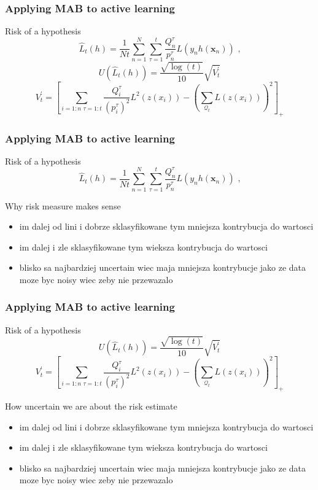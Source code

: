 \documentclass{beamer}
\begin{document}
  \begin{frame}
  \frametitle{Applying MAB to active learning}
  \begin{alertblock}{Risk of a hypothesis}
  $$
  \hat{L}_t(h) = \frac{1}{Nt} \sum_{n=1}^{N} \sum_{\tau = 1}^{t} 
\frac{Q^{\tau}_n}{p^{\tau}_n} L(y_n h(\mathbf{x}_n)) \text{~,}
  $$
  $$U(\hat{L}_t(h)) = \frac{ \sqrt{ \log(t) } }
                       { 10 }
                  \sqrt{ V^\prime_t }$$
  $$V^\prime_t = \left[
  \sum_{i = 1:n \text{~} \tau = 1:t} \frac{Q^\tau_i}{(p^\tau_i)^2} L^2(z(x_i))
  -
  \left( \sum_{\mathscr{Q}_t} L(z(x_i)) \right)^2
\right]_+$$
  \end{alertblock}
  \end{frame}
  \begin{frame}
  \frametitle{Applying MAB to active learning}
  \begin{alertblock}{Risk of a hypothesis}
  $$
  \hat{L}_t(h) = \frac{1}{Nt} \sum_{n=1}^{N} \sum_{\tau = 1}^{t} 
\frac{Q^{\tau}_n}{p^{\tau}_n} L(y_n h(\mathbf{x}_n)) \text{~,}
  $$
  \end{alertblock}
  \begin{block}{Why risk measure makes sense}
    \begin{itemize}
      \item im dalej od lini i dobrze sklasyfikowane tym mniejsza kontrybucja do wartosci
      \item im dalej i zle sklasyfikowane tym wieksza kontrybucja do wartosci
      \item blisko sa najbardziej uncertain wiec maja mniejsza kontrybucje jako ze data moze byc noisy wiec zeby nie przewazalo
    \end{itemize}
  \end{block}
  \end{frame}
  \begin{frame}
  \frametitle{Applying MAB to active learning}
  \begin{alertblock}{Risk of a hypothesis}
  $$U(\hat{L}_t(h)) = \frac{ \sqrt{ \log(t) } }
                       { 10 }
                  \sqrt{ V^\prime_t }$$
  $$V^\prime_t = \left[
  \sum_{i = 1:n \text{~} \tau = 1:t} \frac{Q^\tau_i}{(p^\tau_i)^2} L^2(z(x_i))
  -
  \left( \sum_{\mathscr{Q}_t} L(z(x_i)) \right)^2
\right]_+$$
  \end{alertblock}
  \begin{block}{How uncertain we are about the risk estimate}
    \begin{itemize}
      \item im dalej od lini i dobrze sklasyfikowane tym mniejsza kontrybucja do wartosci
      \item im dalej i zle sklasyfikowane tym wieksza kontrybucja do wartosci
      \item blisko sa najbardziej uncertain wiec maja mniejsza kontrybucje jako ze data moze byc noisy wiec zeby nie przewazalo
    \end{itemize}
  \end{block}
  \end{frame}
\end{document}
